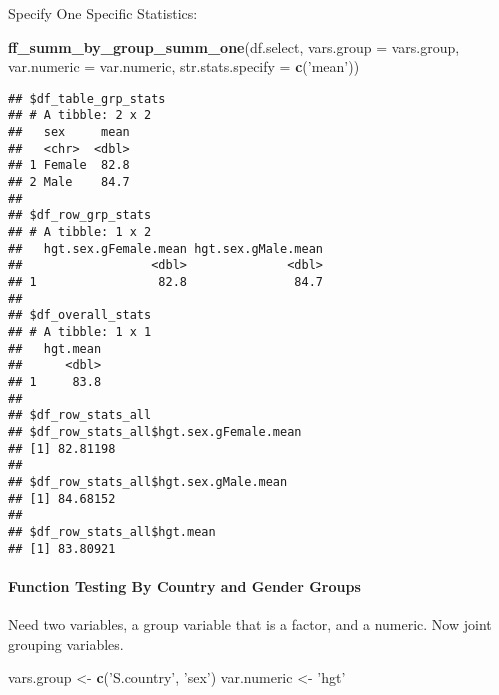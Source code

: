 \documentclass[
]{book}
\newenvironment{Shaded}{\begin{snugshade}}{\end{snugshade}}
\newcommand{\DataTypeTok}[1]{\textcolor[rgb]{0.13,0.29,0.53}{#1}}
\newcommand{\KeywordTok}[1]{\textcolor[rgb]{0.13,0.29,0.53}{\textbf{#1}}}
\newcommand{\NormalTok}[1]{#1}
\newcommand{\OperatorTok}[1]{\textcolor[rgb]{0.81,0.36,0.00}{\textbf{#1}}}
\newcommand{\StringTok}[1]{\textcolor[rgb]{0.31,0.60,0.02}{#1}}
\begin{document}
Specify One Specific Statistics:

\begin{Shaded}
\begin{Highlighting}[]
\KeywordTok{ff_summ_by_group_summ_one}\NormalTok{(df.select, }\DataTypeTok{vars.group =}\NormalTok{ vars.group, }\DataTypeTok{var.numeric =}\NormalTok{ var.numeric, }\DataTypeTok{str.stats.specify =} \KeywordTok{c}\NormalTok{(}\StringTok{'mean'}\NormalTok{))}
\end{Highlighting}
\end{Shaded}

\begin{verbatim}
## $df_table_grp_stats
## # A tibble: 2 x 2
##   sex     mean
##   <chr>  <dbl>
## 1 Female  82.8
## 2 Male    84.7
## 
## $df_row_grp_stats
## # A tibble: 1 x 2
##   hgt.sex.gFemale.mean hgt.sex.gMale.mean
##                  <dbl>              <dbl>
## 1                 82.8               84.7
## 
## $df_overall_stats
## # A tibble: 1 x 1
##   hgt.mean
##      <dbl>
## 1     83.8
## 
## $df_row_stats_all
## $df_row_stats_all$hgt.sex.gFemale.mean
## [1] 82.81198
## 
## $df_row_stats_all$hgt.sex.gMale.mean
## [1] 84.68152
## 
## $df_row_stats_all$hgt.mean
## [1] 83.80921
\end{verbatim}

\hypertarget{function-testing-by-country-and-gender-groups}{%
\paragraph{Function Testing By Country and Gender Groups}\label{function-testing-by-country-and-gender-groups}}

Need two variables, a group variable that is a factor, and a numeric. Now joint grouping variables.

\begin{Shaded}
\begin{Highlighting}[]
\NormalTok{vars.group <-}\StringTok{ }\KeywordTok{c}\NormalTok{(}\StringTok{'S.country'}\NormalTok{, }\StringTok{'sex'}\NormalTok{)}
\NormalTok{var.numeric <-}\StringTok{ 'hgt'}
\end{Highlighting}
\end{Shaded}

\begin{Shaded}
\end{Shaded}
\end{document}
